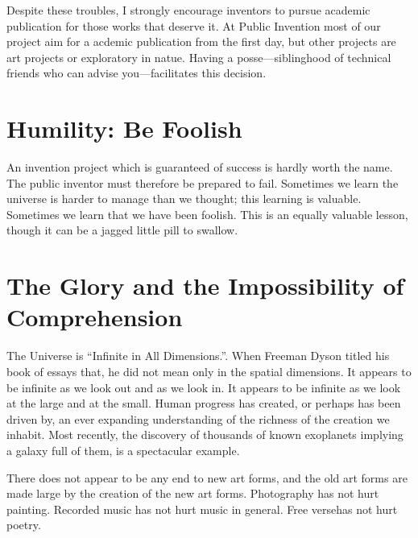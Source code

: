 \documentclass[
	fontsize=10pt, %
	twoside=false, %
	secnumdepth=1, %
]{kaobook}
\begin{document}
Despite these troubles, I strongly encourage inventors to pursue
academic publication for those works that deserve it. At Public Invention
most of our project aim for a acdemic publication from the first day,
but other projects are art projects or exploratory in natue.
Having a posse---siblinghood of technical friends who can advise you---facilitates this decision.

\section{Humility: Be Foolish}

An invention project which is guaranteed of success is hardly worth the name.
The public inventor must therefore be prepared to fail.
Sometimes we learn the universe is harder to manage than we thought;
this learning is valuable.
Sometimes we learn that we have been foolish.
This is an equally valuable lesson, though it can be a jagged little pill
to swallow.

\section{The Glory and the Impossibility of Comprehension}

The Universe is ``Infinite in All Dimensions.''\cite{Dyson1989}.
When Freeman Dyson titled his book of essays that, he did not mean
only in the spatial dimensions.
It appears to be infinite as we look out and as we look in.
It appears to be infinite as we look at the large and at the small.
Human progress has created, or perhaps has been driven by,
an ever expanding understanding of the richness of the creation
we inhabit. Most recently, the discovery of thousands of known
exoplanets implying a galaxy full of them, is a spectacular example.

There does not appear to be any end to new art forms, and the
old art forms are made large by the creation of the new art forms.
Photography has not hurt painting.
Recorded music has not hurt music in general.
Free versehas not hurt poetry.
\end{document}
